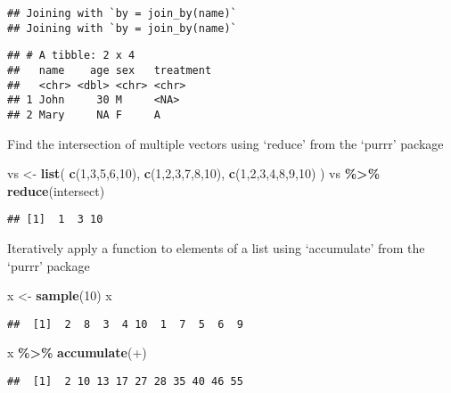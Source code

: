 \documentclass[
]{article}
\newenvironment{Shaded}{\begin{snugshade}}{\end{snugshade}}
\newcommand{\AttributeTok}[1]{\textcolor[rgb]{0.13,0.29,0.53}{#1}}
\newcommand{\DecValTok}[1]{\textcolor[rgb]{0.00,0.00,0.81}{#1}}
\newcommand{\FunctionTok}[1]{\textcolor[rgb]{0.13,0.29,0.53}{\textbf{#1}}}
\newcommand{\NormalTok}[1]{#1}
\newcommand{\OtherTok}[1]{\textcolor[rgb]{0.56,0.35,0.01}{#1}}
\newcommand{\SpecialCharTok}[1]{\textcolor[rgb]{0.81,0.36,0.00}{\textbf{#1}}}
\newcommand{\StringTok}[1]{\textcolor[rgb]{0.31,0.60,0.02}{#1}}
\begin{document}
\begin{verbatim}
## Joining with `by = join_by(name)`
## Joining with `by = join_by(name)`
\end{verbatim}

\begin{verbatim}
## # A tibble: 2 x 4
##   name    age sex   treatment
##   <chr> <dbl> <chr> <chr>    
## 1 John     30 M     <NA>     
## 2 Mary     NA F     A
\end{verbatim}

Find the intersection of multiple vectors using `reduce' from the
`purrr' package

\begin{Shaded}
\begin{Highlighting}[]
\NormalTok{vs }\OtherTok{\textless{}{-}} \FunctionTok{list}\NormalTok{(}
  \FunctionTok{c}\NormalTok{(}\DecValTok{1}\NormalTok{,}\DecValTok{3}\NormalTok{,}\DecValTok{5}\NormalTok{,}\DecValTok{6}\NormalTok{,}\DecValTok{10}\NormalTok{),}
  \FunctionTok{c}\NormalTok{(}\DecValTok{1}\NormalTok{,}\DecValTok{2}\NormalTok{,}\DecValTok{3}\NormalTok{,}\DecValTok{7}\NormalTok{,}\DecValTok{8}\NormalTok{,}\DecValTok{10}\NormalTok{),}
  \FunctionTok{c}\NormalTok{(}\DecValTok{1}\NormalTok{,}\DecValTok{2}\NormalTok{,}\DecValTok{3}\NormalTok{,}\DecValTok{4}\NormalTok{,}\DecValTok{8}\NormalTok{,}\DecValTok{9}\NormalTok{,}\DecValTok{10}\NormalTok{)}
\NormalTok{)}
\NormalTok{vs }\SpecialCharTok{\%\textgreater{}\%} \FunctionTok{reduce}\NormalTok{(intersect)}
\end{Highlighting}
\end{Shaded}

\begin{verbatim}
## [1]  1  3 10
\end{verbatim}

Iteratively apply a function to elements of a list using `accumulate'
from the `purrr' package

\begin{Shaded}
\begin{Highlighting}[]
\NormalTok{x }\OtherTok{\textless{}{-}} \FunctionTok{sample}\NormalTok{(}\DecValTok{10}\NormalTok{)}
\NormalTok{x}
\end{Highlighting}
\end{Shaded}

\begin{verbatim}
##  [1]  2  8  3  4 10  1  7  5  6  9
\end{verbatim}

\begin{Shaded}
\begin{Highlighting}[]
\NormalTok{x }\SpecialCharTok{\%\textgreater{}\%} \FunctionTok{accumulate}\NormalTok{(}\StringTok{\textasciigrave{}}\AttributeTok{+}\StringTok{\textasciigrave{}}\NormalTok{)}
\end{Highlighting}
\end{Shaded}

\begin{verbatim}
##  [1]  2 10 13 17 27 28 35 40 46 55
\end{verbatim}
\end{document}
